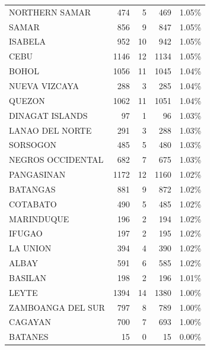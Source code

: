 \begin{tabular}{lrrrr}
NORTHERN SAMAR & 474 & 5 & 469 & 1.05\% \\
SAMAR & 856 & 9 & 847 & 1.05\% \\
ISABELA & 952 & 10 & 942 & 1.05\% \\
CEBU & 1146 & 12 & 1134 & 1.05\% \\
BOHOL & 1056 & 11 & 1045 & 1.04\% \\
NUEVA VIZCAYA & 288 & 3 & 285 & 1.04\% \\
QUEZON & 1062 & 11 & 1051 & 1.04\% \\
DINAGAT ISLANDS & 97 & 1 & 96 & 1.03\% \\
LANAO DEL NORTE & 291 & 3 & 288 & 1.03\% \\
SORSOGON & 485 & 5 & 480 & 1.03\% \\
NEGROS OCCIDENTAL & 682 & 7 & 675 & 1.03\% \\
PANGASINAN & 1172 & 12 & 1160 & 1.02\% \\
BATANGAS & 881 & 9 & 872 & 1.02\% \\
COTABATO & 490 & 5 & 485 & 1.02\% \\
MARINDUQUE & 196 & 2 & 194 & 1.02\% \\
IFUGAO & 197 & 2 & 195 & 1.02\% \\
LA UNION & 394 & 4 & 390 & 1.02\% \\
ALBAY & 591 & 6 & 585 & 1.02\% \\
BASILAN & 198 & 2 & 196 & 1.01\% \\
LEYTE & 1394 & 14 & 1380 & 1.00\% \\
ZAMBOANGA DEL SUR & 797 & 8 & 789 & 1.00\% \\
CAGAYAN & 700 & 7 & 693 & 1.00\% \\
BATANES & 15 & 0 & 15 & 0.00\% \\
\bottomrule
\end{tabular}
